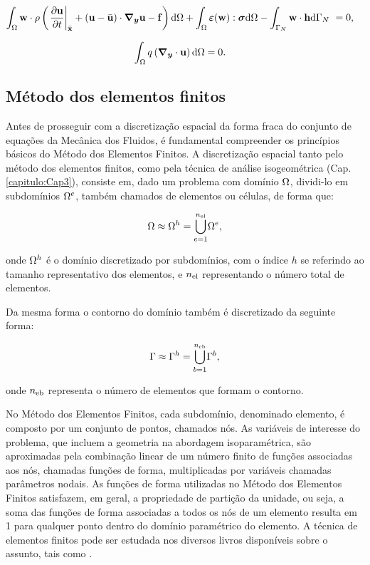 \documentclass[tese_patricia]{subfiles}%
\begin{document}
\begin{align}
\int_{\Omega} \mathbf{w} \cdot \rho  \left(\left . \frac{\partial\mathbf{u}}{\partial t} \right|_{\bar{\mathbf{x}}} + \left(\mathbf{u} - \bar{\mathbf{u}} \right)\cdot\boldsymbol{\nabla_y} \mathbf{u} - \mathbf{f} \right) \mathrm{d} \Omega + \int_{\Omega} \bm{\varepsilon}(\mathbf{w}) : \boldsymbol{\sigma}  \mathrm{d} \Omega - \int_{\Gamma_{N}} \mathbf{w} \cdot \mathbf{h} \mathrm{d}\Gamma_{N}  \  &= 0,  \label{eq:QM_forma_fraca_0_cap2} 
\end{align}

\begin{align}
\int_{\Omega} q \left(\boldsymbol{\nabla_y} \cdot \mathbf{u}\right) \mathrm{d} \Omega &= 0. \label{eq:C_forma_fraca_0_cap2} 
\end{align}


\subsection{Método dos elementos finitos }

Antes de prosseguir com a discretização espacial da forma fraca do conjunto de equações da Mecânica dos Fluidos, é fundamental compreender os princípios básicos do Método dos Elementos Finitos.  A discretização espacial tanto pelo método dos elementos finitos, como pela técnica de análise isogeométrica (Cap. \ref{capitulo:Cap3}), consiste em, dado um problema com domínio $\Omega$, dividi-lo em subdomínios $\Omega^e$, também chamados de elementos ou células, de forma que:

\begin{align}
	\Omega \approx \Omega^h = {\bigcup_{e = 1}^{n_{\mathrm{el}}}} \Omega^e,
\end{align}

\noindent onde $\Omega^h$ é o domínio discretizado por subdomínios, com o índice $h$ se referindo ao tamanho representativo dos elementos, e $n_{\mathrm{el}}$ representando o número total de elementos.

Da mesma forma o contorno do domínio também é discretizado da seguinte forma:

\begin{align}
	\Gamma \approx \Gamma^h = {\bigcup_{b = 1}^{n_{\mathrm{eb}}}} \Gamma^{b},
\end{align}

\noindent onde $n_{\mathrm{eb}}$ representa o número de elementos que formam o contorno.

No Método dos Elementos Finitos, cada subdomínio, denominado elemento, é composto por um conjunto de pontos, chamados nós. As variáveis de interesse do problema, que incluem a geometria na abordagem isoparamétrica, são aproximadas pela combinação linear de um número finito de funções associadas aos nós, chamadas funções de forma, multiplicadas por variáveis chamadas parâmetros nodais. As funções de forma utilizadas no Método dos Elementos Finitos satisfazem, em geral, a propriedade de partição da unidade, ou seja, a soma das funções de forma associadas a todos os nós de um elemento resulta em 1 para qualquer ponto dentro do domínio paramétrico do elemento. A técnica de elementos finitos pode ser estudada nos diversos livros disponíveis sobre o assunto, tais como .
\end{document}
